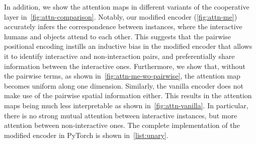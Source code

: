 \documentclass[10pt,twocolumn,letterpaper]{article}
\begin{document}
In addition, we show the attention maps in different variants of the cooperative layer in~\cref{fig:attn-comparison}. Notably, our modified encoder (\cref{fig:attn-me}) accurately infers the correspondence between instances, where the interactive humans and objects attend to each other. This suggests that the pairwise positional encoding instills an inductive bias in the modified encoder that allows it to identify interactive and non-interaction pairs, and preferentially share information between the interactive ones. Furthermore, we show that, without the pairwise terms, as shown in~\cref{fig:attn-me-wo-pairwise}, the attention map becomes uniform along one dimension. Similarly, the vanilla encoder does not make use of the pairwise spatial information either. This results in the attention maps being much less interpretable as shown in~\cref{fig:attn-vanilla}. In particular, there is no strong mutual attention between interactive instances, but more attention between non-interactive ones. The complete implementation of the modified encoder in PyTorch is shown in~\cref{list:unary}.
\end{document}
